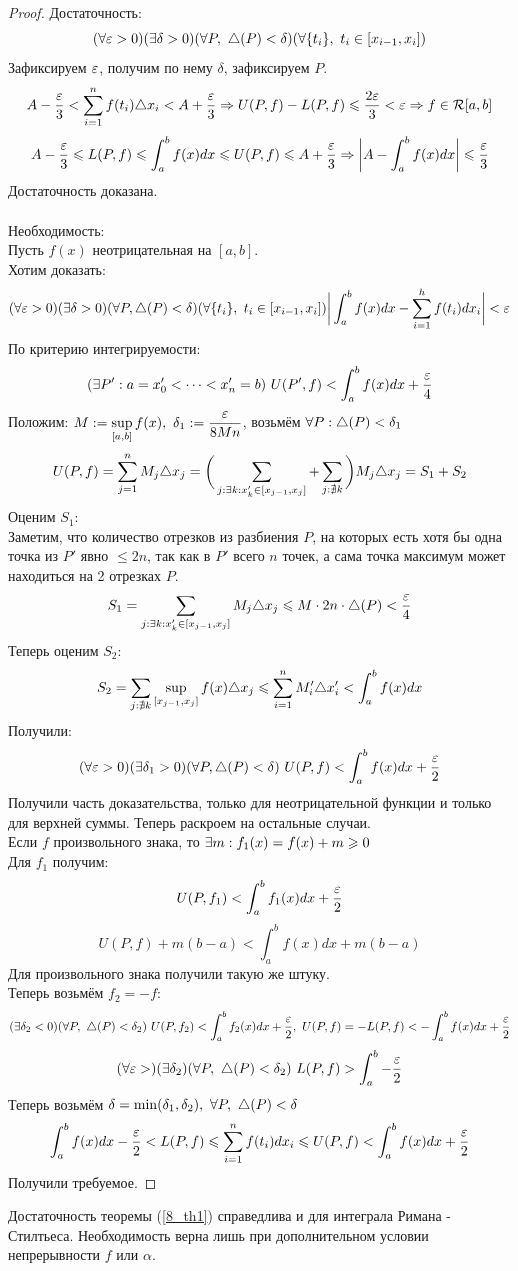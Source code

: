 \begin{proof}
	Достаточность:
	\[(\fa\eps>0)(\ex\delta>0)(\fa P,\ \tr(P)<\delta)(\fa\{t_i\},\ t_i\in[x_{i-1},x_i])\]
	Зафиксируем $\varepsilon$, получим по нему $\delta$, зафиксируем $P$.
	\[A-\frac\eps3<\sum_{i=1}^nf(t_i)\tr x_i<A+\frac\eps3\Ra U(P,f)-L(P,f)\le \frac{2\eps}{3}<\eps\Ra f\in\mc R[a,b]\]
	\[A-\frac{\varepsilon}3\leqslant L(P,f)\leqslant\int_a^bf(x)dx\leqslant U(P,f)\leqslant A+\frac{\varepsilon}3\Rightarrow\bigg|A-\int_a^bf(x)dx\bigg|\leqslant\frac{\varepsilon}3\]
	Достаточность доказана.\\\\
	Необходимость:\\
	Пусть $f(x)$ неотрицательная на $[a,b]$.\\
	Хотим доказать:
	\[(\fa\eps>0)(\ex\delta>0)(\fa P,\tr(P)<\delta)(\fa\{t_i\},\ t_i\in[x_{i-1},x_i])\bigg|\int_a^bf(x)dx-\sum_{i=1}^hf(t_i)dx_i\bigg|<\eps\]
	По критерию интегрируемости:
	\[(\ex P':a=x_0'<\dots<x_n'=b)\ U(P',f)<\int_a^bf(x)dx+\frac\eps4\]
	Положим: $M:=\smo{\sup_{[a,b]}}f(x),\ \delta_1:=\frac{\eps}{8Mn}$, возьмём $\forall P:\triangle(P)<\delta_1$\\
	\[U(P,f)=\sum_{j=1}^nM_j\tr x_j=\bigg(\sum_{j:\ex k:x_k'\in[x_{j-1},x_j]}+\sum_{j:\nexists k}\bigg)M_j\tr x_j=S_1+S_2\]
	Оценим $S_1$:\\
	Заметим, что количество отрезков из разбиения $P$, на которых есть хотя бы одна точка из $P'$ явно $\le2n$, так как в $P'$ всего $n$ точек, а сама точка максимум может находиться на 2 отрезках $P$.
	\[S_1=\sum_{j:\ex k:x_k'\in[x_{j-1},x_j]}M_j\tr x_j\le M\cdot 2n\cdot \tr(P)<\frac\eps4\]
	Теперь оценим $S_2$:
	\[S_2=\sum_{j:\nexists k}\sup_{[x_{j-1},x_j]}f(x)\tr x_j\le\sum_{i=1}^nM_i'\tr x_i'<\int_a^bf(x)dx\]
	Получили:
	\[(\forall\varepsilon>0)(\exists\delta_1>0)(\forall P,\triangle(P)<\delta)\ U(P,f)<\int_a^bf(x)dx+\frac{\varepsilon}2\]
	Получили часть доказательства, только для неотрицательной функции и только для верхней суммы. Теперь раскроем на остальные случаи.\\
	Если $f$ произвольного знака, то $\exists m:f_1(x)=f(x)+m\geqslant0$\\
	Для $f_1$ получим:
	\[U(P,f_1)<\int_a^bf_1(x)dx+\frac{\varepsilon}2\]
	\[U(P,f)+m(b-a)<\int_a^bf(x)dx+m(b-a)\]
	Для произвольного знака получили такую же штуку.\\
	Теперь возьмём $f_2=-f$:
	\[(\ex\delta_2<0)(\fa P,\ \tr(P)<\delta_2)\ U(P,f_2)<\int_a^bf_2(x)dx+\frac\eps2,\ U(P,f)=-L(P,f)<-\int_a^bf(x)dx+\frac\eps2\]
	\[(\fa\eps>)(\ex\delta_2)(\fa P,\ \tr(P)<\delta_2)\ L(P,f)>\int_a^b-\frac\eps2\]
	Теперь возьмём $\delta=\min(\delta_1,\delta_2),\ \forall P,\ \triangle(P)<\delta$
	\[\int_a^bf(x)dx-\frac\eps2<L(P,f)\le\sum_{i=1}^nf(t_i)dx_i\le U(P,f)<\int_a^bf(x)dx+\frac\eps2\]
	Получили требуемое.
\end{proof}
\begin{note}
	Достаточность теоремы (\ref{8_th1}) справедлива и для интеграла Римана - Стилтьеса. Необходимость верна лишь при дополнительном условии непрерывности $f$ или $\alpha$.
\end{note}